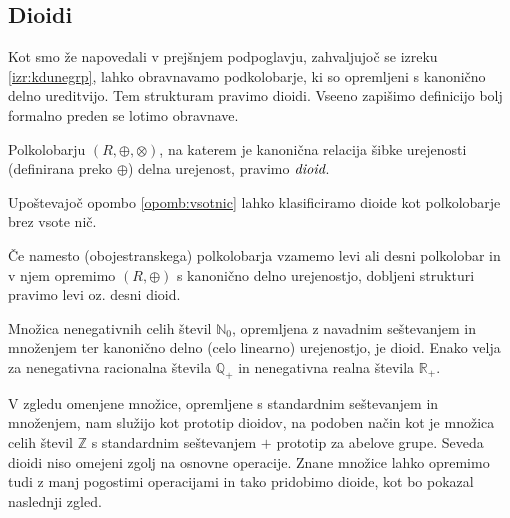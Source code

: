 \documentclass[mat1]{fmfdelo}
\newcommand{\N}{\mathbb{N}}
\newcommand{\Z}{\mathbb{Z}}
\newcommand{\No}{\N_0}
\newcommand{\Pplus}[1]{\mathbb{#1}_{+}}
\newcommand{\pojem}[1]{\ensuremath{\emph{#1}}}
\begin{document}
\subsection{Dioidi}
Kot smo že napovedali v prejšnjem podpoglavju, zahvaljujoč se izreku \ref{izr:kdunegrp}, lahko obravnavamo podkolobarje, ki so opremljeni s kanonično delno ureditvijo. Tem strukturam pravimo dioidi. Vseeno zapišimo definicijo bolj formalno preden se lotimo obravnave.
\begin{definicija}
	Polkolobarju $(R, \oplus, \otimes)$, na katerem je kanonična relacija šibke urejenosti (definirana preko $\oplus$) delna urejenost, pravimo \pojem{dioid}.
\end{definicija}
\begin{opomba}
	Upoštevajoč opombo \ref{opomb:vsotnic} lahko klasificiramo dioide kot polkolobarje brez vsote nič.
\end{opomba}
\begin{opomba}
	Če namesto (obojestranskega) polkolobarja vzamemo levi ali desni polkolobar in v njem opremimo $(R, \oplus)$ s kanonično delno urejenostjo, dobljeni strukturi pravimo levi oz. desni dioid.
\end{opomba}

\begin{zgled}
	Množica nenegativnih celih števil $\No$, opremljena z navadnim seštevanjem in množenjem ter kanonično delno (celo linearno) urejenostjo, je dioid. Enako velja za nenegativna racionalna števila $\Pplus{Q}$ in nenegativna realna števila $\Pplus{R}$.
\end{zgled}

V zgledu omenjene množice, opremljene s standardnim seštevanjem in množenjem, nam služijo kot prototip dioidov, na podoben način kot je množica celih števil $\Z$ s standardnim seštevanjem $+$ prototip za abelove grupe. Seveda dioidi niso omejeni zgolj na osnovne operacije. Znane množice lahko opremimo tudi z manj pogostimi operacijami in tako pridobimo dioide, kot bo pokazal naslednji zgled.
\end{document}
